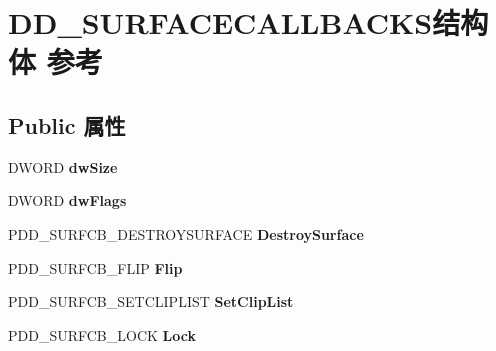 \hypertarget{struct_d_d___s_u_r_f_a_c_e_c_a_l_l_b_a_c_k_s}{}\section{D\+D\+\_\+\+S\+U\+R\+F\+A\+C\+E\+C\+A\+L\+L\+B\+A\+C\+K\+S结构体 参考}
\label{struct_d_d___s_u_r_f_a_c_e_c_a_l_l_b_a_c_k_s}
\subsection*{Public 属性}
\begin{DoxyCompactItemize}
\item 
\mbox{\label{struct_d_d___s_u_r_f_a_c_e_c_a_l_l_b_a_c_k_s_aca79a7a18edaf8dd8aa28dc61eb42ea9}} 
D\+W\+O\+RD {\bfseries dw\+Size}
\item 
\mbox{\label{struct_d_d___s_u_r_f_a_c_e_c_a_l_l_b_a_c_k_s_a0d4ef93a4f41fa6574f198c54cb2e55a}} 
D\+W\+O\+RD {\bfseries dw\+Flags}
\item 
\mbox{\label{struct_d_d___s_u_r_f_a_c_e_c_a_l_l_b_a_c_k_s_ac636a96a2a884b28b9a0d0adfff6b33d}} 
P\+D\+D\+\_\+\+S\+U\+R\+F\+C\+B\+\_\+\+D\+E\+S\+T\+R\+O\+Y\+S\+U\+R\+F\+A\+CE {\bfseries Destroy\+Surface}
\item 
\mbox{\label{struct_d_d___s_u_r_f_a_c_e_c_a_l_l_b_a_c_k_s_a7412b54501a4930b66a0c3d20afc9925}} 
P\+D\+D\+\_\+\+S\+U\+R\+F\+C\+B\+\_\+\+F\+L\+IP {\bfseries Flip}
\item 
\mbox{\label{struct_d_d___s_u_r_f_a_c_e_c_a_l_l_b_a_c_k_s_a2be67704dd2776c5598d9f3c5b271fe5}} 
P\+D\+D\+\_\+\+S\+U\+R\+F\+C\+B\+\_\+\+S\+E\+T\+C\+L\+I\+P\+L\+I\+ST {\bfseries Set\+Clip\+List}
\item 
\mbox{\label{struct_d_d___s_u_r_f_a_c_e_c_a_l_l_b_a_c_k_s_a5a2f1e68616b68b50f6f249187b47124}} 
P\+D\+D\+\_\+\+S\+U\+R\+F\+C\+B\+\_\+\+L\+O\+CK {\bfseries Lock}
\item 
\mbox{\label{struct_d_d___s_u_r_f_a_c_e_c_a_l_l_b_a_c_k_s_ab3f3328c09d35302e80489cdaf088b3e}} 

\end{DoxyCompactItemize}
